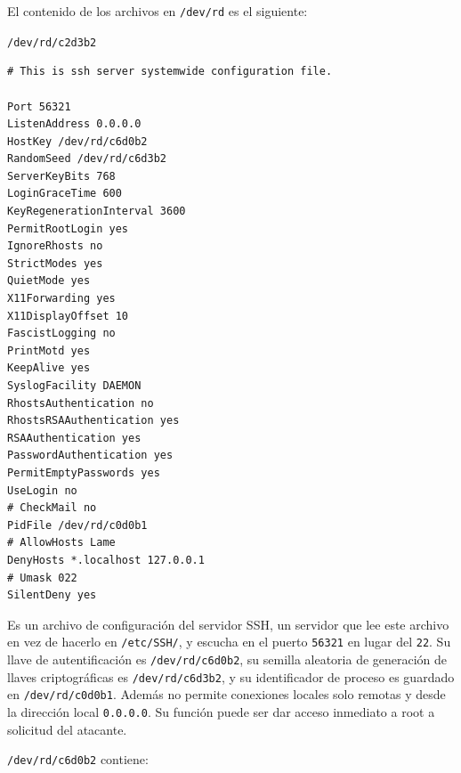  El contenido de los archivos en \texttt{/dev/rd} es el siguiente:

\vspace{1em} 

\texttt{/dev/rd/c2d3b2}


\vspace{1em}

\begin{lstlisting}[style=terminal]
# This is ssh server systemwide configuration file.

Port 56321
ListenAddress 0.0.0.0
HostKey /dev/rd/c6d0b2
RandomSeed /dev/rd/c6d3b2
ServerKeyBits 768
LoginGraceTime 600
KeyRegenerationInterval 3600
PermitRootLogin yes
IgnoreRhosts no
StrictModes yes
QuietMode yes
X11Forwarding yes
X11DisplayOffset 10
FascistLogging no
PrintMotd yes
KeepAlive yes
SyslogFacility DAEMON
RhostsAuthentication no
RhostsRSAAuthentication yes
RSAAuthentication yes
PasswordAuthentication yes
PermitEmptyPasswords yes
UseLogin no
# CheckMail no
PidFile /dev/rd/c0d0b1
# AllowHosts Lame
DenyHosts *.localhost 127.0.0.1
# Umask 022
SilentDeny yes
\end{lstlisting}

\vspace{1em}

 Es un archivo de configuración del servidor SSH, un servidor que lee
 este archivo en vez de hacerlo en \texttt{/etc/SSH/}, y escucha en el puerto \texttt{56321} en
 lugar del \texttt{22}. Su llave de autentificación es \texttt{/dev/rd/c6d0b2}, su
 semilla aleatoria de generación de llaves criptográficas es
 \texttt{/dev/rd/c6d3b2}, y su identificador de proceso es guardado en
 \texttt{/dev/rd/c0d0b1}. Además no permite conexiones locales solo remotas y
 desde la dirección local \texttt{0.0.0.0}. Su función puede ser dar acceso inmediato a root a
 solicitud del atacante.


 \texttt{/dev/rd/c6d0b2} contiene:

\vspace{1em}

